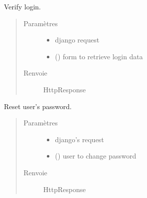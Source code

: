 \documentclass[letterpaper,10pt,french]{sphinxmanual}
\begin{document}

\begin{fulllineitems}
\label{\detokenize{accounts:accounts.views.login_user}}
Verify login.
\begin{quote}\begin{description}
\item[{Paramètres}] \leavevmode\begin{itemize}
\item {}
 \textendash{} django request

\item {}
 ({\hyperref[\detokenize{accounts:accounts.forms.LoginForm}]{}}) \textendash{} form to retrieve login data

\end{itemize}

\item[{Renvoie}] \leavevmode
HttpResponse

\end{description}\end{quote}

\end{fulllineitems}


\begin{fulllineitems}
\label{\detokenize{accounts:accounts.views.reset_password}}
Reset user’s password.
\begin{quote}\begin{description}
\item[{Paramètres}] \leavevmode\begin{itemize}
\item {}
 \textendash{} django’s request

\item {}
 () \textendash{} user to change password

\end{itemize}

\item[{Renvoie}] \leavevmode
HttpResponse

\end{description}\end{quote}

\end{fulllineitems}
\end{document}
